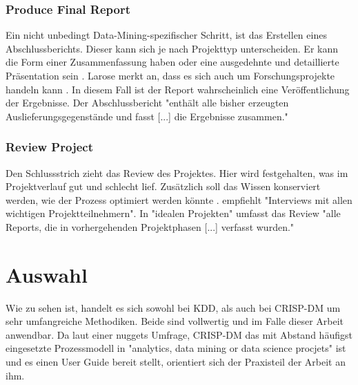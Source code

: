 \subsubsection{Produce Final Report}
Ein nicht unbedingt Data-Mining-spezifischer Schritt, ist das Erstellen eines Abschlussberichts. Dieser kann sich je nach Projekttyp unterscheiden. Er kann die Form einer Zusammenfassung haben oder eine ausgedehnte und detaillierte Präsentation sein . Larose merkt an, dass es sich auch um Forschungsprojekte handeln kann \citep[Punkt 1.4.1.1]{larose_discovering_2014}. In diesem Fall ist der Report wahrscheinlich eine Veröffentlichung der Ergebnisse. Der Abschlussbericht "enthält alle bisher erzeugten Auslieferungsgegenstände und fasst [...] die Ergebnisse zusammen."\citep[S~18; eigene Übersetzung]{shearer_crisp-dm_2000}

\subsubsection{Review Project}
Den Schlussstrich zieht das Review des Projektes. Hier wird festgehalten, was im Projektverlauf gut und schlecht lief. Zusätzlich soll das Wissen konserviert werden, wie der Prozess optimiert werden könnte .
\citep[S.~18; eigene Übersetzung]{shearer_crisp-dm_2000} empfiehlt "Interviews mit allen wichtigen Projektteilnehmern". In "idealen Projekten" umfasst das Review "alle Reports, die in vorhergehenden Projektphasen [...] verfasst wurden."\citep[S.~29; eigene Übersetzung]{chapman_crisp-dm_2000}

\section{Auswahl}\label{sec:crispdmdec}
Wie zu sehen ist, handelt es sich sowohl bei KDD, als auch bei CRISP-DM um sehr umfangreiche Methodiken. Beide sind vollwertig und im Falle dieser Arbeit anwendbar. Da laut einer \gls{nuggets} Umfrage, CRISP-DM das mit Abstand häufigst eingesetzte Prozessmodell in "analytics, data mining or data science procjets" ist \citep{piatetsky_crisp-dm_2014} und es einen User Guide bereit stellt\citep[S.~7]{chapman_crisp-dm_2000}, orientiert sich der Praxisteil der Arbeit an ihm.


